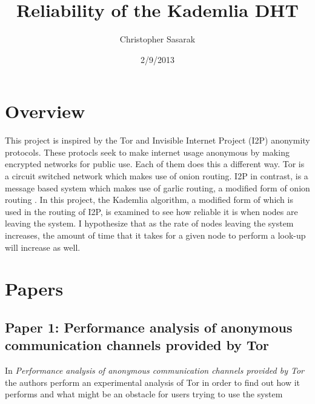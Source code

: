 \documentclass[notitlepage,12pt]{article}
\author{Christopher Sasarak}
\date{2/9/2013}
\title{Reliability of the Kademlia DHT}
\begin{document}
\maketitle

\section{Overview}
\label{sec:over}

This project is inspired by the Tor and Invisible Internet Project (I2P) anonymity protocols. These
protocls seek to make internet usage anonymous by making encrypted
networks for public use. Each of them does this a different way. Tor
is a circuit switched network which makes use of onion
routing\cite{tor}. I2P in contrast, is a message based system which
makes use of garlic routing, a modified form of onion routing
\cite{i2p}. In this project, the Kademlia algorithm, a modified form
of which is used in the routing of I2P, is examined to see how
reliable it is when nodes are leaving the system. I hypothesize that
as the rate of nodes leaving the system increases, the amount of time
that it takes for a given node to perform a look-up will increase as
well.

\section{Papers}
\label{sec:papers}

\subsection{Paper 1: Performance analysis of anonymous communication channels provided by Tor}
\label{sec:Tor}

In \emph{Performance analysis of anonymous communication channels
  provided by Tor} the authors perform an experimental analysis of Tor
in order to find out how it performs and what might be an obstacle for
users trying to use the system \cite[p.1]{tor}



\end{document}
